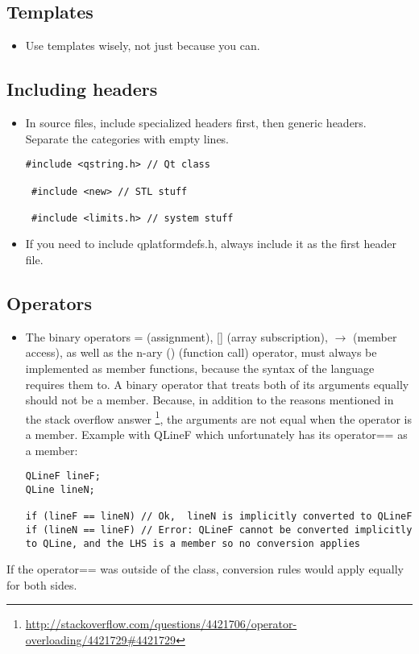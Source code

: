 \documentclass[a4paper,12pt]{article}
\begin{document}
\subsection{Templates}
\begin{itemize}
\item Use templates wisely, not just because you can.
\end{itemize}

\subsection{Including headers}
\begin{itemize}
\item In source files, include specialized headers first, then generic headers. Separate the categories with empty lines.
\begin{lstlisting}[breaklines]
 #include <qstring.h> // Qt class
 
 #include <new> // STL stuff
 
 #include <limits.h> // system stuff
 \end{lstlisting}
\item If you need to include qplatformdefs.h, always include it as the first header file.
\end{itemize}

\subsection{Operators}
\begin{itemize}
\item The binary operators = (assignment), [] (array subscription),  $\rightarrow$ (member access), as well as the n-ary () (function call) operator, must always be implemented as member functions, because the syntax of the language requires them to. A binary operator that treats both of its arguments equally should not be a member. Because, in addition to the reasons mentioned in the stack overflow answer \footnote{\url{http://stackoverflow.com/questions/4421706/operator-overloading/4421729\#4421729}}, the arguments are not equal when the operator is a member. Example with QLineF which unfortunately has its operator== as a member:
\begin{lstlisting}[breaklines]
QLineF lineF;
QLine lineN;
 
if (lineF == lineN) // Ok,  lineN is implicitly converted to QLineF
if (lineN == lineF) // Error: QLineF cannot be converted implicitly to QLine, and the LHS is a member so no conversion applies
 \end{lstlisting}
\end{itemize}
If the operator== was outside of the class, conversion rules would apply equally for both sides.
\end{document}
